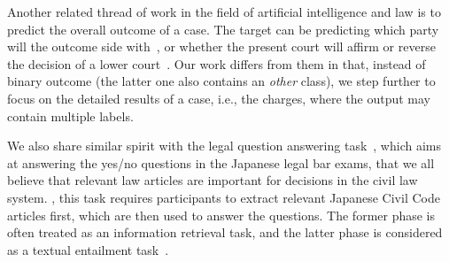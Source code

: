 Another related thread of work in the field of artificial intelligence and law is to predict the overall outcome of a case. The target can be predicting which party will the outcome side with~\cite{aletras2016predicting}, or whether the present court will affirm or reverse the decision of a lower court~\cite{katz2016general}. Our work differs from them in that, instead of binary outcome (the latter one also contains an \emph{other} class), we step further to focus on the detailed results of a case, i.e., the charges, where the output may contain multiple labels. 



We also share similar spirit with the legal question answering task~\cite{COLIEE14}, which aims at answering the yes/no questions in the Japanese legal bar exams, that we all believe that relevant law articles are important for decisions in the civil law system. 
, this task requires participants to extract relevant Japanese Civil Code articles first, 
which are then used to answer the questions. 
The former phase is often treated as an information retrieval task, and the latter phase is considered as a textual entailment task~\cite{kim2014legal,carvalho2016lexical}. 

